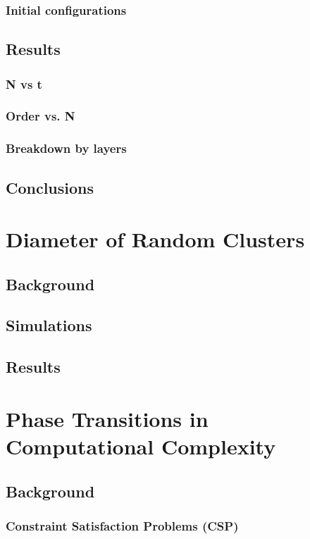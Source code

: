 \documentclass{umthesis}
\begin{document}
\subsection{Initial configurations}
\label{sec-2.2.4}
\section{Results}
\label{sec-2.3}
\subsection{N vs t}
\label{sec-2.3.1}
\subsection{Order vs. N}
\label{sec-2.3.2}
\subsection{Breakdown by layers}
\label{sec-2.3.3}
\section{Conclusions}
\label{sec-2.4}
\chapter{Diameter of Random Clusters}
\label{sec-3}
\section{Background}
\label{sec-3.1}
\section{Simulations}
\label{sec-3.2}
\section{Results}
\label{sec-3.3}
\chapter{Phase Transitions in Computational Complexity}
\label{sec-4}
\section{Background}
\label{sec-4.1}
\subsection{Constraint Satisfaction Problems (CSP)}
\label{sec-4.1.1}
\end{document}
